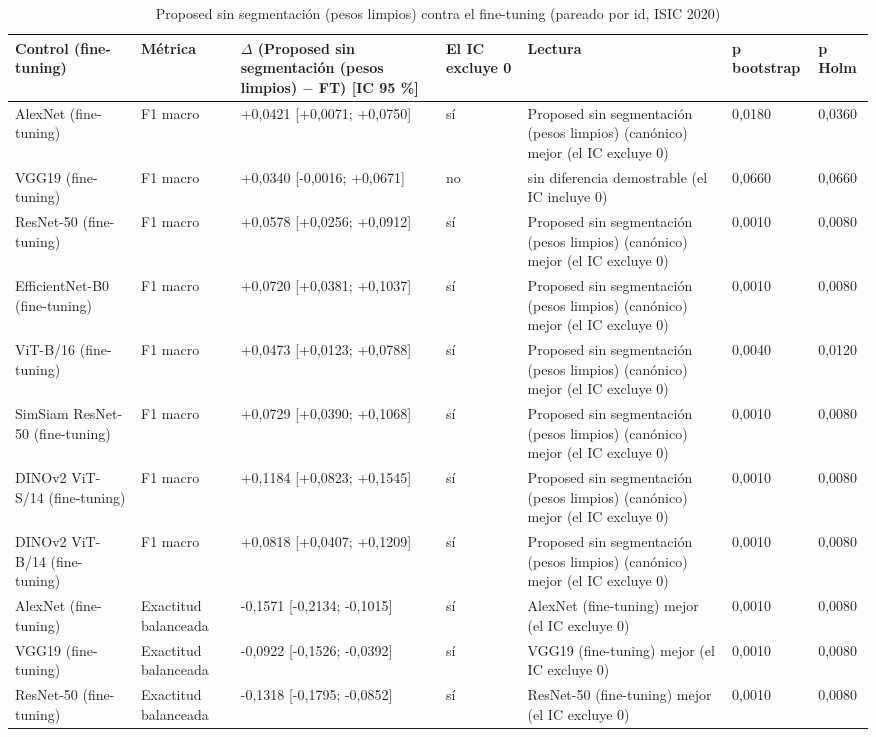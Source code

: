 \begingroup\scriptsize
\begin{longtable}{@{}lllllll@{}}
\caption{Proposed sin segmentación (pesos limpios) contra el fine-tuning (pareado por id, ISIC 2020)}\label{tab:ft-contrasts} \\
\toprule
Control (fine-tuning) & Métrica & $\Delta$ (Proposed sin segmentación (pesos limpios) $-$ FT) [IC 95 \%] & El IC excluye 0 & Lectura & p bootstrap & p Holm \\
\midrule
AlexNet (fine-tuning) & F1 macro & +0,0421 [+0,0071; +0,0750] & sí & Proposed sin segmentación (pesos limpios) (canónico) mejor (el IC excluye 0) & 0,0180 & 0,0360 \\
VGG19 (fine-tuning) & F1 macro & +0,0340 [-0,0016; +0,0671] & no & sin diferencia demostrable (el IC incluye 0) & 0,0660 & 0,0660 \\
ResNet-50 (fine-tuning) & F1 macro & +0,0578 [+0,0256; +0,0912] & sí & Proposed sin segmentación (pesos limpios) (canónico) mejor (el IC excluye 0) & 0,0010 & 0,0080 \\
EfficientNet-B0 (fine-tuning) & F1 macro & +0,0720 [+0,0381; +0,1037] & sí & Proposed sin segmentación (pesos limpios) (canónico) mejor (el IC excluye 0) & 0,0010 & 0,0080 \\
ViT-B/16 (fine-tuning) & F1 macro & +0,0473 [+0,0123; +0,0788] & sí & Proposed sin segmentación (pesos limpios) (canónico) mejor (el IC excluye 0) & 0,0040 & 0,0120 \\
SimSiam ResNet-50 (fine-tuning) & F1 macro & +0,0729 [+0,0390; +0,1068] & sí & Proposed sin segmentación (pesos limpios) (canónico) mejor (el IC excluye 0) & 0,0010 & 0,0080 \\
DINOv2 ViT-S/14 (fine-tuning) & F1 macro & +0,1184 [+0,0823; +0,1545] & sí & Proposed sin segmentación (pesos limpios) (canónico) mejor (el IC excluye 0) & 0,0010 & 0,0080 \\
DINOv2 ViT-B/14 (fine-tuning) & F1 macro & +0,0818 [+0,0407; +0,1209] & sí & Proposed sin segmentación (pesos limpios) (canónico) mejor (el IC excluye 0) & 0,0010 & 0,0080 \\
AlexNet (fine-tuning) & Exactitud balanceada & -0,1571 [-0,2134; -0,1015] & sí & AlexNet (fine-tuning) mejor (el IC excluye 0) & 0,0010 & 0,0080 \\
VGG19 (fine-tuning) & Exactitud balanceada & -0,0922 [-0,1526; -0,0392] & sí & VGG19 (fine-tuning) mejor (el IC excluye 0) & 0,0010 & 0,0080 \\
ResNet-50 (fine-tuning) & Exactitud balanceada & -0,1318 [-0,1795; -0,0852] & sí & ResNet-50 (fine-tuning) mejor (el IC excluye 0) & 0,0010 & 0,0080 \\

\end{longtable}
